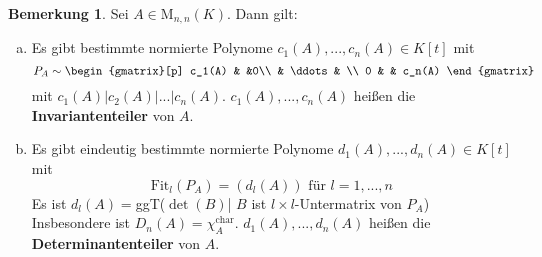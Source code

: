 \documentclass[a4paper, titlepage]{article}
\theoremstyle{definition}
\newtheorem{bem}[satz]{Bemerkung}
\newcommand{\Fit}{\mathrm{Fit}}
\newcommand{\M}{\mathrm{M}}
\begin{document}
\begin{bem}
    Sei $A\in\M_{n,n}(K).$ Dann gilt: 
    \begin{enumerate}[(a)]
        \item Es gibt bestimmte normierte Polynome $c_1(A),...,c_n(A)\in K[t]$ mit 
         $$ P_A\sim \begin{gmatrix}[p]
            c_1(A) & &0\\
            & \ddots & \\
            0 & & c_n(A)
         \end{gmatrix}$$ mit $c_1(A)|c_2(A)|...|c_n(A).$ $c_1(A),...,c_n(A)$ heißen die \textbf{Invariantenteiler} von $A$.
         \item Es gibt eindeutig bestimmte normierte Polynome $d_1(A),...,d_n(A)\in K[t]$ mit 
            $$\Fit_{l}(P_A)=(d_l(A))\text{ für }l=1,...,n$$
            Es ist $d_l(A)=$ggT($\det(B)$| $B$ ist $l\times l$-Untermatrix von $P_A$)
            Insbesondere ist $D_n(A)=\chi_{A}^{\text{char}}.$ $d_1(A),...,d_n(A)$ heißen die \textbf{Determinantenteiler} von $A$.
        \end{enumerate}
    \end{bem}
\end{document}
